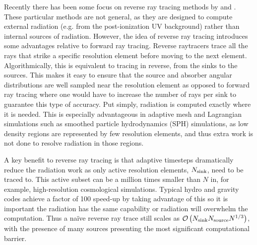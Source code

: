 \documentclass[fleq,usenatbib]{mnras}
\newcommand{\bigO}[1]{\mathcal{O}\left(#1\right)}
\newcommand{\NS}{N_{\rm source}}
\newcommand{\NK}{N_{\rm sink}}
\begin{document}
Recently there has been some focus on reverse ray tracing methods by
\cite{clarkEt12} and \cite{altayTheuns13}. These particular methods are not 
general, as they are designed to compute external radiation (e.g. from the 
post-ionization UV background) rather than internal sources of radiation. 
However, the idea of reverse ray tracing introduces some advantages relative 
to forward ray tracing.  Reverse raytracers trace all the rays that strike
a specific resolution element before moving to the next element.
Algorithmically, this is equivalent to tracing in reverse, from the sinks to the sources.
This makes it easy to ensure that the source and absorber angular distributions
are well sampled near the resolution element as opposed to 
forward ray tracing where one would have to increase the number of rays per 
sink to guarantee this type of accuracy. Put simply, radiation is computed 
exactly where it is needed.  This is especially advantageous in adaptive mesh 
and Lagrangian simulations such as smoothed particle hydrodynamics (SPH) 
simulations, as low density regions are represented by few resolution 
elements, and thus extra work is not done to resolve radiation in those 
regions.

A key benefit to reverse ray tracing is that adaptive timesteps dramatically 
reduce the radiation work as only active resolution elements, $\NK$, need 
to be traced to. This active subset can be a million times smaller than 
$N$ in, for example, high-resolution cosmological simulations.
Typical hydro and gravity codes achieve a factor of 100 speed-up by taking advantage of this
so it is important the radiation has the same capability or radiation will overwhelm the computation.
Thus a na\"ive reverse 
ray trace still scales as $\bigO{\NK \NS N^{1/3}}$, with the presence of many 
sources presenting the most significant computational barrier.
\end{document}

